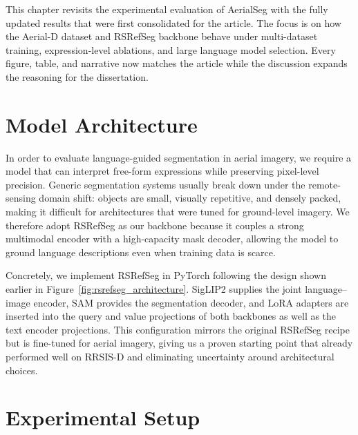 \cleardoublepage
\label{chap:evaluation}

This chapter revisits the experimental evaluation of AerialSeg with the fully updated results that were first consolidated for the article. The focus is on how the Aerial-D dataset and RSRefSeg backbone behave under multi-dataset training, expression-level ablations, and large language model selection. Every figure, table, and narrative now matches the article while the discussion expands the reasoning for the dissertation.

\section{Model Architecture}

In order to evaluate language-guided segmentation in aerial imagery, we require a model that can interpret free-form expressions while preserving pixel-level precision. Generic segmentation systems usually break down under the remote-sensing domain shift: objects are small, visually repetitive, and densely packed, making it difficult for architectures that were tuned for ground-level imagery. We therefore adopt RSRefSeg as our backbone because it couples a strong multimodal encoder with a high-capacity mask decoder, allowing the model to ground language descriptions even when training data is scarce.

Concretely, we implement RSRefSeg in PyTorch following the design shown earlier in Figure~\ref{fig:rsrefseg_architecture}. SigLIP2 supplies the joint language--image encoder, SAM provides the segmentation decoder, and LoRA adapters are inserted into the query and value projections of both backbones as well as the text encoder projections. This configuration mirrors the original RSRefSeg recipe but is fine-tuned for aerial imagery, giving us a proven starting point that already performed well on RRSIS-D and eliminating uncertainty around architectural choices.

\section{Experimental Setup}

